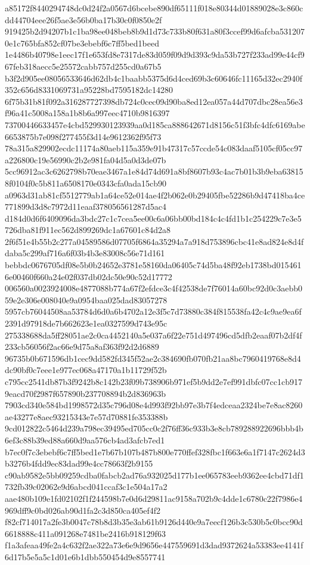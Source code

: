 \documentclass[11pt,a4paper]{article}
\begin{document}
{a85172f8440294748dc0d24f2a0567d6bcebe890df65111f018e80344d01889028e3c860cdd44704eee26f5ae3e56b0ba17b30c0f0850e2f
919425b2d94207b1c1ba98ee048beb8b9d1d73c733b80f631a80f3ccef99d6afcba5312070e1c765bfa852cf07be3ebebf6c7ff5bed1beed
1e4486b40798e1eec17f1e653fd8e7317de83d059f09d9d393c9da53b727f233ad99e44cf967feb318aecc5e25572cabb757d255cd0a67b5
b3f2d905ee08056533646d62db4c1baabb5375d6d4ced69b3c60646fc11165d32ec2940f352c656d8331069731a95228bd7595182dc14280
6f75b31b81f092a316287727398db724c0cec09d90ba8ed12ea057a44d707dbc28ea56e3f96a41c5008a158a1b8b6a997eec4710b9816397
73700446633457e4cbd529930123939aa0d185ca888642671d8156c51f3bfc4dfc6169abe6653875b7e098f277455f3d14e9612362f95f73
78a315a829902ecdc11174a80aeb115a359e91b47317c57ccde54c083daaf5105cf05cc97a226800c19e56990c2b2e981fa04d5a0d3de07b
5cc96912ac3c6262798b70eae3467a1e84d74d691a8bf8607b93c4ac7b01b3b9eba638158f0104f0c5b811a6508170e0343cfa0ada15cb90
a0963d31ab81cf5512779ab1a64ce52e014ae4f2b062e0b29405fbe52286b9d47418ba4ce771899d3d8c7972d11eaaf378056561287d5ac4
d184d0d6f6409096da3bdc27c1c7cea5ee00c6a06bb00bd184c4c4fd1b1c254229c7e3e5726dba81f911ec562d899269dc1a67601c84d2a8
2f6f51e4b55b2c277a04589586d07705f6864a35294a7a918d753896cbc41e8ad824e8d4fdaba5c299af716a6f03b4b3e83008c56e71d161
bebbdc0676705df08e5b0b24652e3781e58160da06405c74d5ba48f92eb1738bd0154616e00460f660a24e02f037db02dc50e90c52d17772
006560a0023924008e4877088b774a67f2efdce3c4f42538de7f76014a60bc92d0c3aebb059e2e306e008040e9a0954baa025dad83057278
5957cb76044508aa53784d6d0a6b4702a12e3f5c7d73880c384f815538fa42c4c9ae9ea6f2391d97918de7b662623e1ea0327599d743e95c
275338688da5ff28051ae2c0ca4452140a5e037a6f22e751d497496cd5dfb2eaaf07b2df4f233cb56056f2ac66e9d75a8af363f92d2d6889
96735b0b671596db1cec9dd582fd345f52ae2c384690fb070fb21aa8bc7960419768e8d4dc90bf0c7eee1e977ec068a47170a1b11729f52b
c795cc2541db87b3f9242b8c142b23f09b738906b971ef5b9dd2e7ef991dbfc07cc1cb9179eacd70f2987f657890b237708894b2d836963b
7903cd340e584bd1998572d35c796d08e4d993f92bb97e3b7f4edceaa2324be7e8ac8260ae43277e8aec93215343e7e57d70881fe353388b
9cd012822c5464d239a798ec39495ed705cc0c2f76ff36c933b3e8cb789288922696bbb4b6ef3c88b39ed88a660d9aa576cb4ad3afcb7ed1
b7ec0f7c3ebebf6c7ff5bed1e7b67b107b487b800e770ffef328fbc1f663e6a1f7147c2624d3b3276b4fdd9ec83dad99e4cc78663f2b9155
c90ab9582e5bb09259cdba0fabcb2ad76a932025d177b1ee065783eeb9362ee4cbd71df1732fb39c02062e9d6abcd041ccaf3c1e504a17a2
aae480b109e1fd02102f1f244598b7e0d6d29811ac9158a702b9c4dde1c6780c22f7986e4969dff9c0bd026ab90d1fa2c3d850ca405ef4f2
f82cf714017a2fe3b0047c78b8d3b35e3ab61b9126d440e9a7eecf126b3c530b5c0bcc90d6618888c411a091268e7481be2416b918129f63
f1a3afeaa49fe2a4c632f2ae322a73e6e9d9656e447559691d3dad9372624a53383ee4141f6d17b5e5a5c1d01e6b1dbb550454d9e8557741
}
\end{document}

